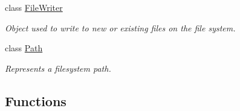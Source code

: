 \begin{DoxyCompactItemize}
class \hyperlink{classchaos_1_1io_1_1sys_1_1_file_writer}{File\-Writer}
\begin{DoxyCompactList}\small\item\em Object used to write to new or existing files on the file system. \end{DoxyCompactList}\item 
class \hyperlink{classchaos_1_1io_1_1sys_1_1_path}{Path}
\begin{DoxyCompactList}\small\item\em Represents a filesystem path. \end{DoxyCompactList}\end{DoxyCompactItemize}
\subsection*{Functions}
